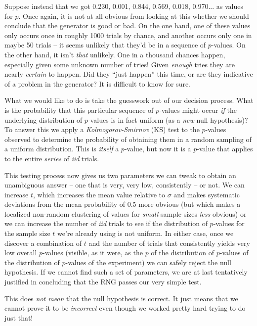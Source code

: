\documentclass{book}
\begin{document}
Suppose instead that we got 0.230, 0.001, 0.844, 0.569, 0.018, 0.970...
as values for $p$.  Once again, it is not at all obvious from looking at
this whether we should conclude that the generator is good or bad.  On
the one hand, one of these values only occurs once in roughly 1000
trials by chance, and another occurs only one in maybe 50 trials -- it
seems unlikely that they'd be in a sequence of $p$-values.  On the other
hand, it isn't {\em that} unlikely.  One in a thousand chances happen,
especially given some unknown number of tries!  Given \emph{enough}
tries they are nearly \emph{certain} to happen.  Did they ``just
happen'' this time, or are they indicative of a problem in the
generator?  It is difficult to know for sure.

What we would like to do is take the guesswork out of our decision
process.  What is the probability that this particular sequence of
$p$-values might occur {\em if} the underlying distribution of
$p$-values is in fact uniform (as a {\em new} null hypothesis)?  To
answer this we apply a {\em Kolmogorov-Smirnov} (KS) test to the
$p$-values observed to determine the probability of obtaining them in a
random sampling of a uniform distribution.  This is {\em itself} a
$p$-value, but now it is a $p$-value that applies to the entire {\em
series} of {\em iid} trials.

This testing process now gives us two parameters we can tweak to obtain
an unambiguous answer -- one that is very, very low, consistently -- or
not.  We can increase $t$, which increases the mean value relative to
$\sigma$ and makes systematic deviations from the mean probability of 0.5
more obvious (but which makes a localized non-random clustering of
values for {\em small} sample sizes {\em less} obvious) or we can
increase the number of {\em iid} trials to see if the distribution of
$p$-values for the sample size $t$ we're already using is not uniform.
In either case, once we discover a combination of $t$ and the number of
trials that consistently yields very low overall $p$-values (visible, as
it were, as the $p$ of the distribution of $p$-values of the
distribution of $p$-values of the experiment) we can safely reject the
null hypothesis.  If we cannot find such a set of parameters, we are at
last tentatively justified in concluding that the RNG passes our very
simple test.  

This does {\em not mean} that the null hypothesis is correct.  It just
means that we cannot prove it to be {\em incorrect} even though we
worked pretty hard trying to do just that!
\end{document}
